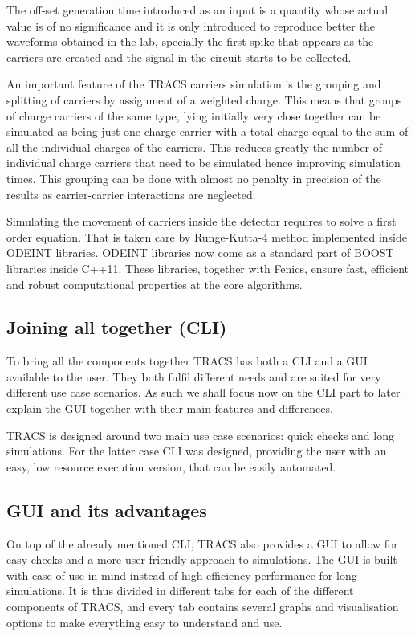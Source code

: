 The off-set generation time introduced as an input is a quantity whose actual value is of no significance and it is only introduced to reproduce better the waveforms obtained in the lab, specially the first spike that appears as the carriers are created and the signal in the circuit starts to be collected. 

An important feature of the TRACS carriers simulation is the grouping and splitting of carriers by assignment of a weighted charge. This means that groups of charge carriers  of the same type, lying initially very close together can be simulated as being just one charge carrier with a total charge equal to the sum of all the individual charges of the carriers. This reduces greatly the number of individual charge carriers that need to be simulated hence improving simulation times. This grouping can be done with almost no penalty in precision of the results as carrier-carrier interactions are neglected.

Simulating the movement of carriers inside the detector requires to solve a first order equation. That is taken care by Runge-Kutta-4 method implemented inside ODEINT libraries. ODEINT libraries now come as a standard part of BOOST libraries inside C++11. These libraries, together with Fenics, ensure fast, efficient and robust computational properties at the core algorithms.



\subsection{Joining all together (CLI)}

To bring all the components together TRACS has both a CLI and a GUI available to the user. They both fulfil different needs and are suited for very different use case scenarios. As such we shall focus now on the CLI part to later explain the GUI together with their main features and differences.

TRACS is designed around two main use case scenarios: quick checks and long simulations. For the latter case CLI was designed, providing the user with an easy, low resource execution version, that can be easily automated. 

\subsection{GUI and its advantages}

On top of the already mentioned CLI, TRACS also provides a GUI to allow for easy checks and a more user-friendly approach to simulations. The GUI is built with ease of use in mind instead of high efficiency performance for long simulations. It is thus divided in different tabs for each of the different components of TRACS, and every tab contains several graphs and visualisation options to make everything easy to understand and use.

